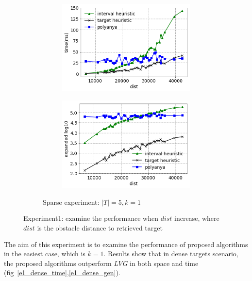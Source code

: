 \begin{figure}[!htb]
  \begin{subfigure}{\linewidth}
    \begin{subfigure}{0.5\textwidth}
        \centering
        \includegraphics[width=.9\textwidth]{pic/e1_sparse_time.png}
        \caption{}
        \label{e1_sparse_time}
    \end{subfigure}%
    \hfill
    \begin{subfigure}{0.5\textwidth}
        \centering
        \includegraphics[width=.9\textwidth]{pic/e1_sparse_gen.png}
        \caption{}
        \label{e1_sparse_gen}
    \end{subfigure}
    \caption*{\small Sparse experiment: $|T| = 5, k=1$}
  \end{subfigure}
  \caption{\small Experiment1: examine the performance when $dist$ increase, where
  $dist$ is the obstacle distance to retrieved target}
\end{figure}

The aim of this experiment is to examine the performance of proposed algorithms in the easiest case, which is $k=1$.
Results show that in dense targets scenario, the proposed algorithms outperform \textit{LVG} in both space and time (fig~\ref{e1_dense_time},\ref{e1_dense_gen}).

